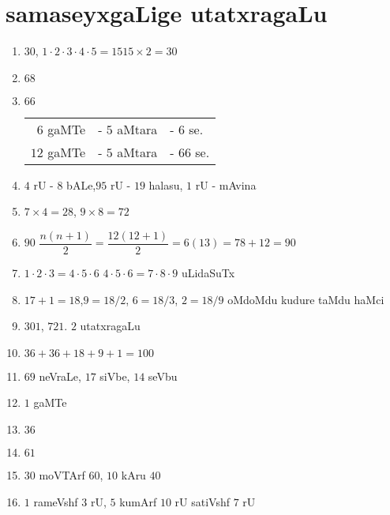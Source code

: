 \chapter{samaseyxgaLige utatxragaLu}

\begin{enumerate}
 \renewcommand{\labelenumi}{\rm(\theenumi)}
\item $30$, \qquad $1 \cdot 2 \cdot 3 \cdot 4 \cdot 5 = 15$\qquad  $15 \times 2 =30$

\item $68$

\item $66$ \qquad \begin{tabular}[t]{rrl}
  $6$ gaMTe&  - $5$ aMtara & - $6$ se.\\
  $12$ gaMTe & - $5$ aMtara & - $66$ se.
\end{tabular}

\item $4$ rU - $8$ bALe,\qquad  $95$ rU - $19$ halasu, \qquad  $1$ rU - mAvina

\item $7 \times 4 = 28$, \qquad $9 \times 8 = 72$

\item $90$ \qquad $\dfrac{n(n+1)}{2} = \dfrac{12(12+1)}{2} = 6(13) = 78 +12 = 90$

\item $1 \cdot 2 \cdot  3 = 4 \cdot  5 \cdot 6$ \qquad $4\cdot 5\cdot 6=7\cdot 8\cdot 9$ uLidaSuTx

\item $17+1 =18$,\quad $9 =18/2$, \quad $6=18/3$, \quad $2 = 18/9$ oMdoMdu kudure taMdu haMci

\item $301$, $721$. $2$ utatxragaLu
  
  \eject
  
\item $36+36+18+9+1 = 100$

\item $69$ neVraLe, $17$ siVbe, $14$ seVbu

\item $1$ gaMTe

\item $36$

\item $61$

\item $30$ moVTArf $60$, $10$ kAru $40$

\item $1$ rameVshf $3$ rU, $5$ kumArf $10$ rU satiVshf $7$ rU


\end{enumerate}
